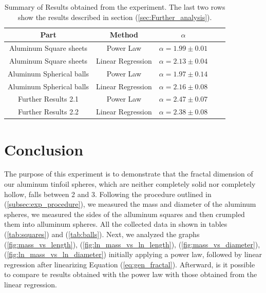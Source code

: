 \documentclass[a4paper,12pt]{article}
\begin{document}
\begin{table}[h!]
    \centering
    \caption{Summary of Results obtained from the experiment. The last two rows show the results described in section (\ref{sec:Further_analysis}).}
    \label{tab:summary_results}
    \begin{tabular}{|c|c|c|c|c|}
    \hline
    \textbf{Part} & \textbf{Method} & \textbf{$\alpha$}   \\ \hline
    Aluminum Square sheets & Power Law & $\alpha = 1.99 \pm 0.01$   \\ \hline
    Aluminum Square sheets & Linear Regression & $\alpha = 2.13 \pm 0.04$   \\ \hline
    Aluminum Spherical balls & Power Law & $\alpha = 1.97 \pm 0.14$  \\ \hline
    Aluminum Spherical balls & Linear Regression & $\alpha = 2.16 \pm 0.08$   \\ \hline
    Further Results 2.1 & Power Law & $\alpha = 2.47 \pm 0.07$  \\ \hline
    Further Results 2.2 & Linear Regression & $\alpha = 2.38 \pm 0.08$ \\ \hline
    \end{tabular}
    \end{table}
 




\section{Conclusion}\label{sec:conclusion}
The purpose of this experiment is to demonstrate that the fractal dimension of our aluminum tinfoil spheres, 
which are neither completely solid nor completely hollow, falls between 2 and 3.
Following the procedure outlined in (\ref{subsec:exp_procedure}), we measured the mass and diameter of the aluminum spheres,
we measured the sides of the alluminum squares and then crumpled them into alluminum spheres.
All the collected data in shown in tables (\ref{tab:squares}) and (\ref{tab:balls}). 
Next, we analyzed the graphs (\ref{fig:mass_vs_length}), (\ref{fig:ln_mass_vs_ln_length}), (\ref{fig:mass_vs_diameter}), (\ref{fig:ln_mass_vs_ln_diameter}) 
initially applying a power law, followed by linear regression after linearizing Equation (\ref{eq:gen_fractal}).
Afterward, is it possible to compare te results obtained with the power law with those obtained from the linear regression.



\newpage
\printbibliography
\end{document}
